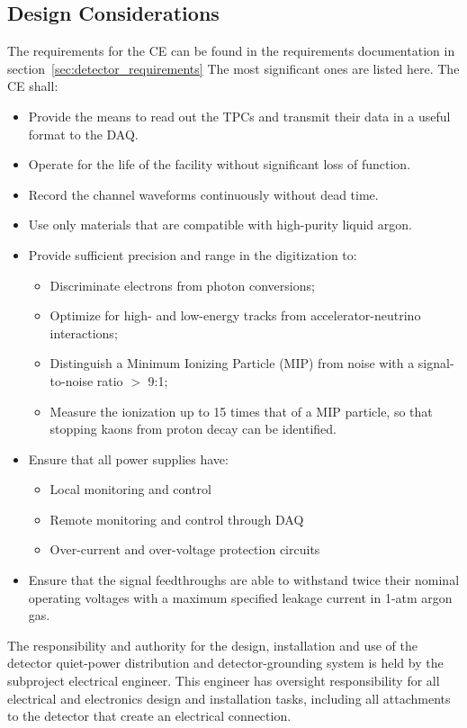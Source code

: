 %
\subsection{Design Considerations} 
\label{subsec:ce_reqs_n_specs}

The requirements for the CE can be found in the requirements documentation in section~\ref{sec:detector_requirements}
The most significant ones are listed here. The CE shall:

\begin{itemize}	
\item Provide the means to read out the TPCs and transmit their data in a useful format to the DAQ.
\item Operate for the life of the facility without significant loss of function.
\item Record the channel waveforms continuously without dead time.
\item Use only materials that are compatible with high-purity liquid argon.
\item Provide sufficient precision and range in the digitization to:
\begin{itemize}
\item Discriminate electrons from photon conversions;
\item Optimize for high- and low-energy tracks from accelerator-neutrino interactions;
\item Distinguish a Minimum Ionizing Particle (MIP) from noise with a signal-to-noise ratio $>$ 9:1;
\item Measure the ionization up to 15 times that of a MIP particle, so that stopping kaons from proton decay can be identified.
\end{itemize}
\item Ensure that all power supplies have: 
\begin{itemize}
\item Local monitoring and control
\item Remote monitoring and control through DAQ
\item Over-current and over-voltage protection circuits
\end{itemize}
\item Ensure that the signal feedthroughs are able to withstand twice their nominal operating voltages 
with a maximum specified leakage current in 1-atm argon gas.
\end{itemize}

The responsibility and authority for the design, installation 
and use of the detector quiet-power distribution and 
detector-grounding system is held by the subproject electrical engineer. 
This engineer has oversight responsibility for all electrical and electronics 
design and installation tasks, including all attachments to the detector 
that create an electrical connection. 


